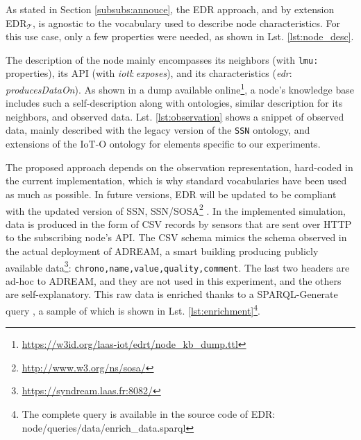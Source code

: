 \documentclass[sw]{iosart2x}
\newcommand{\edr}{EDR\xspace}
\newcommand{\edrt}{EDR$_{\mathcal{T}}$\xspace}
\newcommand{\namespace}[1]{\textit{#1$:$}}
\newcommand{\concept}[2]{\namespace{#1}\-\textit{#2}}
\begin{document}
As stated in Section \textsection \ref{subsubs:annouce}, the \edr approach, and by extension \edrt, is agnostic to the vocabulary used to describe node characteristics. 
For this use case, only a few properties were needed, as shown in Lst. \ref{lst:node_desc}. 

The description of the node mainly encompasses its neighbors (with \texttt{lmu:} properties), its API (with \concept{iotl}{exposes}), and its characteristics (\concept{edr}{producesDataOn}).
As shown in a dump available online\footnote{\url{https://w3id.org/laas-iot/edrt/node_kb_dump.ttl}}, a node's knowledge base includes such a self-description along with ontologies, similar description for its neighbors, and observed data. 
Lst. \ref{lst:observation} shows a snippet of observed data, mainly described with the legacy version of the \texttt{SSN} ontology, and extensions of the IoT-O \cite{Seydoux2016} ontology for elements specific to our experiments. 

The proposed approach depends on the observation representation, hard-coded in the current implementation, which is why standard vocabularies have been used as much as possible. 
In future versions, \edr will be updated to be compliant with the updated version of SSN, SSN/SOSA\footnote{\url{http://www.w3.org/ns/sosa/}} \cite{janowicz:JournalofWebSemantics2019}. 
In the implemented simulation, data is produced in the form of CSV records by sensors that are sent over HTTP to the subscribing node's API.
The CSV schema mimics the schema observed in the actual deployment of ADREAM, a smart building producing publicly available data\footnote{\url{https://syndream.laas.fr:8082/}}: \texttt{chrono,name,value,quality,comment}.
The last two headers are ad-hoc to ADREAM, and they are not used in this experiment, and the others are self-explanatory.
This raw data is enriched thanks to a SPARQL-Generate query \cite{lefrancois:SemanticWeb2017}, a sample of which is shown in Lst. \ref{lst:enrichment}\footnote{The complete query is available in the source code of EDR: node/\-queries/\-data/\-enrich\_data.sparql}. 

\end{document}
